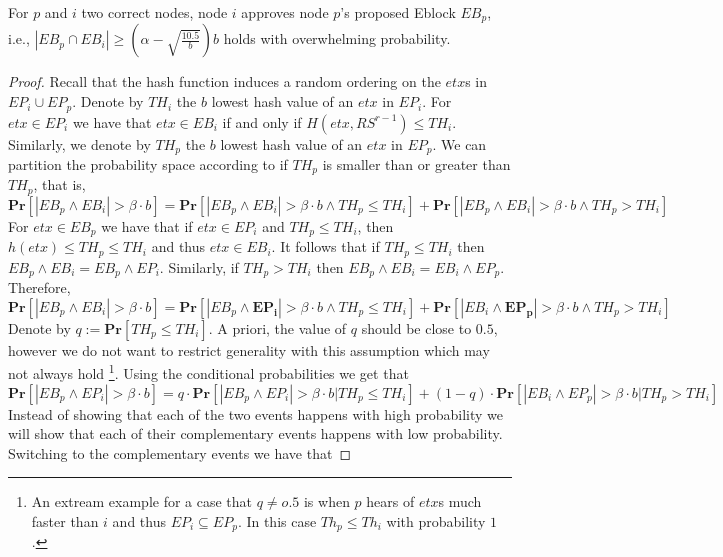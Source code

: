 \begin{claim} {}For $p$ and $i$ two correct nodes, node $i$ approves node $p$'s proposed Eblock $EB_p$, i.e., $|EB_p\cap EB_i|\geq \left(\alpha -\sqrt{\frac{10.5}{b}}\right)b$ holds with overwhelming probability.
\end{claim}
\begin{proof}
Recall that the hash function induces a random ordering on the $etx$s in $EP_i\cup EP_p$. Denote by $TH_i$ the $b$ lowest hash value of an $etx$ in $EP_i$. For $etx\in EP_i$ we have that $etx\in EB_i$ if and only if $H(etx,RS^{r-1})\leq TH_i$. Similarly, we denote by $TH_p$ the $b$ lowest hash value of an $etx$ in $EP_p$. We can partition the probability space according to if $TH_p$ is smaller than or greater than $TH_p$, that is,
\begin{equation}
\textbf{Pr}[|EB_p\wedge  EB_i|>\beta \cdot b ]=\textbf{Pr}[|EB_p\wedge  EB_i|>\beta \cdot b \wedge TH_p\leq TH_i]+\textbf{Pr}[|EB_p\wedge  EB_i|>\beta \cdot b \wedge TH_p>TH_i]
\end{equation}
For $etx\in EB_p$ we have that if $etx\in EP_i$ and $TH_p\leq TH_i$, then $h(etx)\leq TH_p\leq TH_i$ and thus $etx\in EB_i$. It follows that if $TH_p\leq TH_i$ then $EB_p\wedge EB_i=EB_p\wedge EP_i$. Similarly, if $TH_p>TH_i$ then $EB_p\wedge EB_i=EB_i\wedge EP_p$. Therefore,
\begin{equation}\label{partion}
\textbf{Pr}[|EB_p\wedge  EB_i|>\beta \cdot b ]=\textbf{Pr}[|EB_p\wedge  \mathbf{EP_i}|>\beta \cdot b \wedge TH_p\leq TH_i]+\textbf{Pr}[|  EB_i\wedge \mathbf{EP_p}|>\beta \cdot b \wedge TH_p> TH_i]
\end{equation}
Denote by $q:=\textbf{Pr}[TH_p\leq TH_i]$. A priori, the value of $q$ should be close to $0.5$, however we do not want to restrict generality with this assumption which may not always hold \footnote{An extream example for a case that $q\neq o.5$ is when $p$ hears of $etx$s much faster than $i$ and thus $EP_i\subseteq EP_p$. In this case $Th_p\leq Th_i$ with probability $1$.}. Using the conditional probabilities we get that
\begin{equation}
\textbf{Pr}[|EB_p\wedge  EP_i|>\beta \cdot b ]=q\cdot \textbf{Pr}[|EB_p\wedge EP_i|>\beta \cdot b |TH_p\leq TH_i]+(1-q)\cdot\textbf{Pr}[|EB_i\wedge EP_p|>\beta \cdot b |TH_p>TH_i]
\end{equation}
Instead of showing that each of the two events happens with high probability we will show that each of their complementary events happens with low probability. Switching to the complementary events we have that 

\end{proof}
